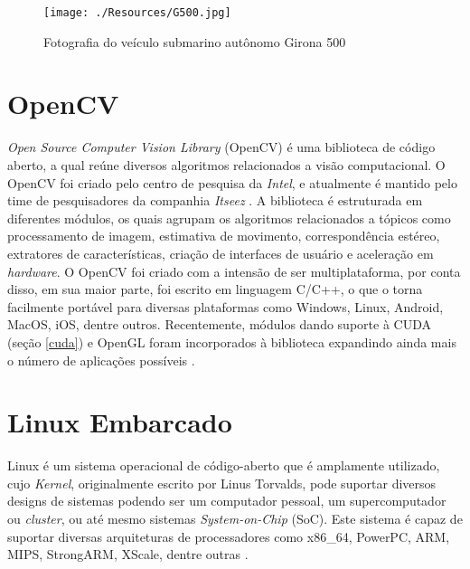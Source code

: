 \begin{figure}[H]
 	\centering
 	\texttt{[image: ./Resources/G500.jpg]}
 	\caption{Fotografia do veículo submarino autônomo Girona 500}
 	\label{G500}
\end{figure}


\section{OpenCV}
\textit{Open Source Computer Vision Library} (OpenCV) é uma biblioteca de código aberto, a qual reúne diversos algoritmos relacionados a visão computacional. O OpenCV foi criado pelo centro de pesquisa da \textit{Intel}, e atualmente é mantido pelo time de pesquisadores da companhia \textit{Itseez} \cite{ItseezOpenCVinfo}. A biblioteca é estruturada em diferentes módulos, os quais agrupam os algoritmos relacionados a tópicos como processamento de imagem, estimativa de movimento, correspondência estéreo, extratores de características, criação de interfaces de usuário e aceleração em \textit{hardware}. O OpenCV foi criado com a intensão de ser multiplataforma, por conta disso, em sua maior parte, foi escrito em linguagem C/C++, o que o torna facilmente portável para diversas plataformas como Windows, Linux, Android, MacOS, iOS, dentre outros. Recentemente, módulos dando suporte à CUDA (seção \ref{cuda}) e OpenGL foram incorporados à biblioteca expandindo ainda mais o número de aplicações possíveis \cite{ItseezOpenCVPlatforms}. 


\section{Linux Embarcado}

Linux é um sistema operacional de código-aberto que é amplamente utilizado, cujo \textit{Kernel}, originalmente escrito por Linus Torvalds, pode suportar diversos designs de sistemas podendo ser um computador pessoal, um supercomputador ou \textit{cluster}, ou até mesmo sistemas \textit{System-on-Chip} (SoC). Este sistema é capaz de suportar diversas arquiteturas de processadores como x86{\_}64, PowerPC, ARM, MIPS, StrongARM, XScale, dentre outras \cite{Wang2011}.

